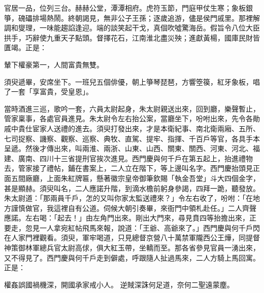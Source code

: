 官居一品，位列三台。赫赫公堂，潭潭相府。虎符玉節，門庭甲仗生寒；象板銀箏，磈礧排場熱鬧。終朝謁見，無非公子王孫；逐歲追游，儘是侯門戚里。那裡解調和燮理，一味能趨諂逢迎。端的談笑起干戈，真個吹噓驚海岳。假旨令八位大臣拱手，巧辭使九重天子點頭。督擇花石，江南淮北盡災殃；進獻黃楊，國庫民財皆匱竭。正是：

輦下權豪第一，人間富貴無雙。

須臾遞畢，安席坐下。一班兒五個俳優，朝上箏琴琵琶，方響箜篌，紅牙象板，唱了一套「享富貴，受皇恩」。

當時酒進三巡，歌吟一套，六員太尉起身，朱太尉親送出來，回到廳，樂聲暫止，管家稟事，各處官員進見。朱太尉令左右抬公案，當廳坐下，吩咐出來，先令各勛戚中貴仕宦家人送禮的進去。須臾打發出來，才是本衛紀事、南北衛兩廂、五所、七司捉察、譏察、觀察、巡察、典牧、直駕、提牢、指揮、千百戶等官，各具手本呈遞。然後才傳出來，叫兩淮、兩浙、山東、山西、關東、關西、河東、河北、福建、廣南、四川十三省提刑官挨次進見。西門慶與何千戶在第五起上，抬進禮物去，管家接了禮帖，鋪在書案上，二人立在階下，等上邊叫名字。西門慶抬頭見正面五間廠廳，上面朱紅牌匾，懸著徽宗皇帝御筆欽賜「執金吾堂」斗大四個金字，甚是顯赫。須臾叫名，二人應諾升階，到滴水檐前躬身參謁，四拜一跪，聽發放。朱太尉道：「那兩員千戶，怎的又叫你家太監送禮來？」令左右收了，吩咐：「在地方謹慎做官，我這裡自有公道。伺候大朝引奏畢，來衙門中領札赴任。」二人齊聲應諾。左右喝：「起去！」由左角門出來。剛出大門來，尋見賁四等抬擔出來，正要走，忽見一人拿宛紅帖飛馬來報，說道：「王爺、高爺來了。」西門慶與何千戶閃在人家門裡觀看。須臾，軍牢喝道，只見總督京營八十萬禁軍隴西公王燁，同提督神策御林軍總兵官太尉高俅，俱大紅玉帶，坐轎而至。那各省參見官員一湧出來，又不得見了。西門慶與何千戶走到僻處，呼跟隨人扯過馬來，二人方騎上馬回寓。正是：

權姦誤國禍機深，開國承家戒小人。
逆賊深誅何足道，奈何二聖遠蒙塵。

